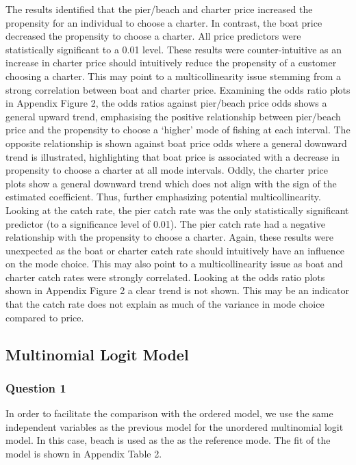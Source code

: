 \documentclass[12pt]{article}
\begin{document}
{The results identified that the pier/beach and charter price increased the propensity for an individual to choose a charter. In contrast, the boat price decreased the propensity to choose a charter. All price predictors were statistically significant to a 0.01 level. These results were counter-intuitive as an increase in charter price should intuitively reduce the propensity of a customer choosing a charter. This may point to a multicollinearity issue stemming from a strong correlation between boat and charter price. Examining the odds ratio plots in Appendix Figure 2, the odds ratios against pier/beach price odds shows a general upward trend, emphasising the positive relationship between pier/beach price and the propensity to choose a ‘higher’ mode of fishing at each interval. The opposite relationship is shown against boat price odds where a general downward trend is illustrated, highlighting that boat price is associated with a decrease in propensity to choose a charter at all mode intervals. Oddly, the charter price plots show a general downward trend which does not align with the sign of the estimated coefficient. Thus, further emphasizing potential multicollinearity.\\

Looking at the catch rate, the pier catch rate was the only statistically significant predictor (to a significance level of 0.01). The pier catch rate had a negative relationship with the propensity to choose a charter. Again, these results were unexpected as the boat or charter catch rate should intuitively have an influence on the mode choice. This may also point to a multicollinearity issue as boat and charter catch rates were strongly correlated. Looking at the odds ratio plots shown in Appendix Figure 2 a clear trend is not shown. This may be an indicator that the catch rate does not explain as much of the variance in mode choice compared to price.\\ 


\subsection*{Multinomial Logit Model}
\subsubsection*{Question 1}
In order to facilitate the comparison with the ordered model, we use the same independent variables as the previous model for the unordered multinomial logit model. In this case, beach is used as the as the reference mode. The fit of the model is shown in Appendix Table 2.\\

}
\end{document}
